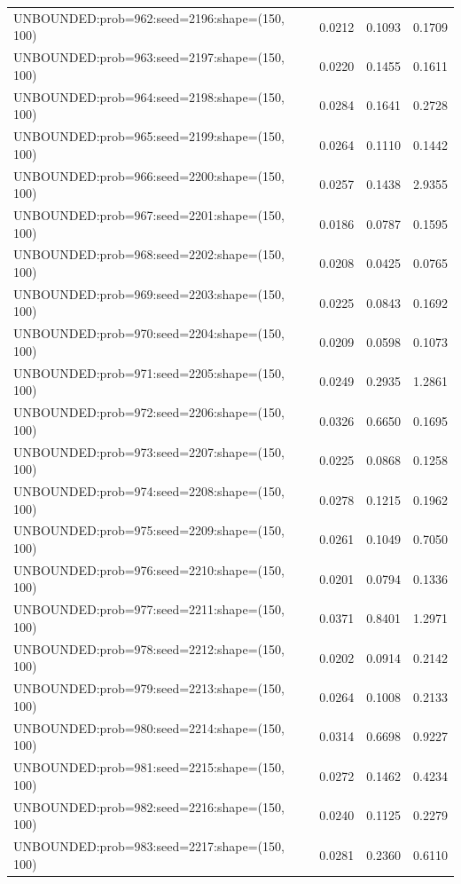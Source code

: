 \begin{longtable}{lccc}
UNBOUNDED:prob=962:seed=2196:shape=(150, 100) &   0.0212 &  0.1093 &  0.1709 \\
UNBOUNDED:prob=963:seed=2197:shape=(150, 100) &   0.0220 &  0.1455 &  0.1611 \\
UNBOUNDED:prob=964:seed=2198:shape=(150, 100) &   0.0284 &  0.1641 &  0.2728 \\
UNBOUNDED:prob=965:seed=2199:shape=(150, 100) &   0.0264 &  0.1110 &  0.1442 \\
UNBOUNDED:prob=966:seed=2200:shape=(150, 100) &   0.0257 &  0.1438 &  2.9355 \\
UNBOUNDED:prob=967:seed=2201:shape=(150, 100) &   0.0186 &  0.0787 &  0.1595 \\
UNBOUNDED:prob=968:seed=2202:shape=(150, 100) &   0.0208 &  0.0425 &  0.0765 \\
UNBOUNDED:prob=969:seed=2203:shape=(150, 100) &   0.0225 &  0.0843 &  0.1692 \\
UNBOUNDED:prob=970:seed=2204:shape=(150, 100) &   0.0209 &  0.0598 &  0.1073 \\
UNBOUNDED:prob=971:seed=2205:shape=(150, 100) &   0.0249 &  0.2935 &  1.2861 \\
UNBOUNDED:prob=972:seed=2206:shape=(150, 100) &   0.0326 &  0.6650 &  0.1695 \\
UNBOUNDED:prob=973:seed=2207:shape=(150, 100) &   0.0225 &  0.0868 &  0.1258 \\
UNBOUNDED:prob=974:seed=2208:shape=(150, 100) &   0.0278 &  0.1215 &  0.1962 \\
UNBOUNDED:prob=975:seed=2209:shape=(150, 100) &   0.0261 &  0.1049 &  0.7050 \\
UNBOUNDED:prob=976:seed=2210:shape=(150, 100) &   0.0201 &  0.0794 &  0.1336 \\
UNBOUNDED:prob=977:seed=2211:shape=(150, 100) &   0.0371 &  0.8401 &  1.2971 \\
UNBOUNDED:prob=978:seed=2212:shape=(150, 100) &   0.0202 &  0.0914 &  0.2142 \\
UNBOUNDED:prob=979:seed=2213:shape=(150, 100) &   0.0264 &  0.1008 &  0.2133 \\
UNBOUNDED:prob=980:seed=2214:shape=(150, 100) &   0.0314 &  0.6698 &  0.9227 \\
UNBOUNDED:prob=981:seed=2215:shape=(150, 100) &   0.0272 &  0.1462 &  0.4234 \\
UNBOUNDED:prob=982:seed=2216:shape=(150, 100) &   0.0240 &  0.1125 &  0.2279 \\
UNBOUNDED:prob=983:seed=2217:shape=(150, 100) &   0.0281 &  0.2360 &  0.6110 \\

\end{longtable}
